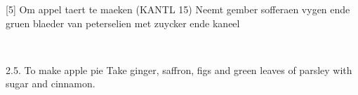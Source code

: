 \documentclass[a4paper]{article}
\begin{document}
\medskip
\begin{minipage}{.45\textwidth}
[5] Om appel taert te maeken  (KANTL 15)
Neemt gember sofferaen vygen ende gruen blaeder van peterselien met zuycker ende kaneel	
\end{minipage}
\begin{minipage}{0.05\textwidth}
\ \ \ 
\end{minipage}
\begin{minipage}{.45\textwidth}
2.5. To make apple pie
Take ginger, saffron, figs and green leaves of parsley with sugar and cinnamon.
\end{minipage}



\end{document}
